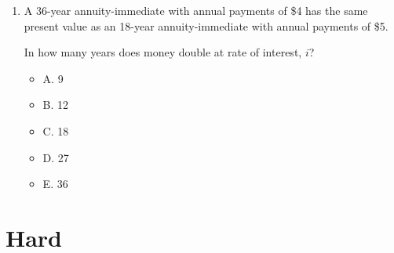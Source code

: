 \documentclass[11pt]{article}
\begin{document}
\begin{enumerate}[label=\textbf{\arabic*.}]
These prices are based on an interest rate of $i$ in 1987, $j$ in 1988, and $k$ in 1989.

Determine $j$.

\begin{itemize}
\item A. 2%
\item B. 3%
\item C. 4%
\item D. 5%
\item E. 6%
\end{itemize}

\medskip
\hrule
\medskip

\item A 36-year annuity-immediate with annual payments of \$4 has the same present value as an 18-year annuity-immediate with annual payments of \$5.

In how many years does money double at rate of interest, $i$?

\begin{itemize}
\item A. 9
\item B. 12
\item C. 18
\item D. 27
\item E. 36
\end{itemize}

\end{enumerate}

\newpage
\section*{Hard}
\end{document}
